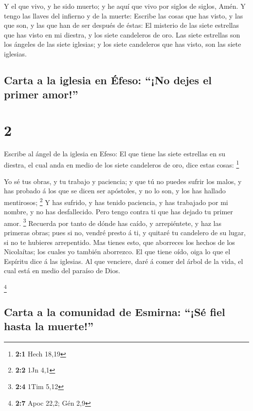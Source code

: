  Y el que vivo, y he sido muerto; y he aquí que vivo por
siglos de siglos, Amén. Y tengo las llaves del infierno y de la muerte:
 Escribe las cosas que has visto, y las que son, y las que
han de ser después de éstas:  El misterio de las siete
estrellas que has visto en mi diestra, y los siete candeleros de oro.
Las siete estrellas son los ángeles de las siete iglesias; y los siete
candeleros que has visto, son las siete iglesias.

\hypertarget{carta-a-la-iglesia-en-uxe9feso-no-dejes-el-primer-amor}{%
\subsection{Carta a la iglesia en Éfeso: ``¡No dejes el primer
amor!''}\label{carta-a-la-iglesia-en-uxe9feso-no-dejes-el-primer-amor}}

\hypertarget{section-1}{%
\section{2}\label{section-1}}

 Escribe al ángel de la iglesia en Efeso: El que tiene las
siete estrellas en su diestra, el cual anda en medio de los siete
candeleros de oro, dice estas cosas: \footnote{\textbf{2:1} Hech 18,19}

 Yo sé tus obras, y tu trabajo y paciencia; y que tú no
puedes sufrir los malos, y has probado á los que se dicen ser apóstoles,
y no lo son, y los has hallado mentirosos; \footnote{\textbf{2:2} 1Jn
  4,1}  Y has sufrido, y has tenido paciencia, y has
trabajado por mi nombre, y no has desfallecido.  Pero tengo
contra ti que has dejado tu primer amor. \footnote{\textbf{2:4} 1Tim
  5,12}  Recuerda por tanto de dónde has caído, y
arrepiéntete, y haz las primeras obras; pues si no, vendré presto á ti,
y quitaré tu candelero de su lugar, si no te hubieres arrepentido.
 Mas tienes esto, que aborreces los hechos de los
Nicolaítas; los cuales yo también aborrezco.  El que tiene
oído, oiga lo que el Espíritu dice á las iglesias. Al que venciere, daré
á comer del árbol de la vida, el cual está en medio del paraíso de Dios.

\footnote{\textbf{2:7} Apoc 22,2; Gén 2,9}

\hypertarget{carta-a-la-comunidad-de-esmirna-suxe9-fiel-hasta-la-muerte}{%
\subsection{Carta a la comunidad de Esmirna: ``¡Sé fiel hasta la
muerte!''}\label{carta-a-la-comunidad-de-esmirna-suxe9-fiel-hasta-la-muerte}}


